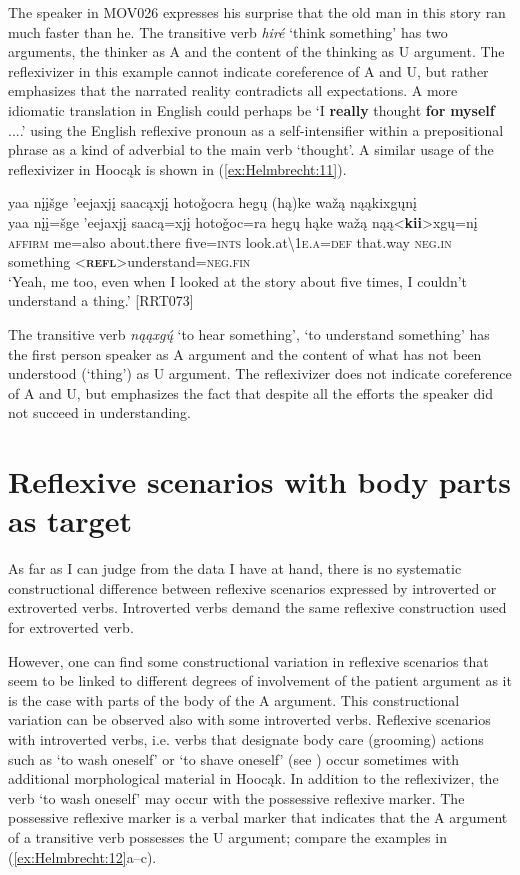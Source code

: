 \documentclass[output=paper]{langscibook}
\begin{document}
The speaker in MOV026 expresses his surprise that the old man in this story ran much faster than he. The transitive verb \textit{hiré} `think something' has two arguments, the thinker as A and the content of the thinking as U argument. The reflexivizer in this example cannot indicate coreference of A and U, but rather emphasizes that the narrated reality contradicts all expectations. A more idiomatic translation in English could perhaps be `I \textbf{really} thought \textbf{for} \textbf{myself} ....' using the English reflexive pronoun as a self-intensifier within a prepositional phrase as a kind of adverbial to the main verb `thought'. A similar usage of the reflexivizer in Hoocąk is shown in (\ref{ex:Helmbrecht:11}).

\ea  \label{ex:Helmbrecht:11} 
 \glll  yaa nįįšge 'eejaxjį saacąxjį hoto\v{g}ocra hegų (hą)ke wažą nąąkixgųnį  \\
   {yaa}  {nįį=šge}   {'eejaxjį}  {saacą=xjį}   {hoto\v{g}oc=ra}  {hegų} {hąke} {wažą}   {nąą<\textbf{kii}>xgų=nį}\\
  {\textsc{affirm}} {me=also}  {about.there} {five=\textsc{ints}} {look.at{\textbackslash}\textsc{1e.a=def}} {that.way}  {\textsc{neg.in}}  {something} {<\textbf{\textsc{\textsc{refl}}}>understand=\textsc{neg.fin}}\\
 \glt `Yeah, me too, even when I looked at the story about five times, I couldn't understand a thing.' [RRT073]
\z 

The transitive verb \textit{nąąxgų́} `to hear something', `to understand something' has the first person speaker as A argument and the content of what has not been understood (`thing') as U argument. The reflexivizer does not indicate coreference of A and U, but emphasizes the fact that despite all the efforts the speaker did not succeed in understanding.

\section{Reflexive scenarios with body parts as target}\label{sec:Helmbrecht:4}

As far as I can judge from the data I have at hand, there is no systematic constructional difference between reflexive scenarios expressed by introverted or extroverted verbs. Introverted verbs demand the same reflexive construction used for extroverted verb. 

However, one can find some constructional variation in reflexive scenarios that seem to be linked to different degrees of involvement of the patient argument as it is the case with parts of the body of the A argument. This constructional variation can be observed also with some introverted verbs. Reflexive scenarios with introverted verbs, i.e. verbs that designate body care (grooming) actions such as `to wash oneself' or `to shave oneself' (see \citealt{haspelmath2019comparing}) occur sometimes with additional morphological material in Hoocąk. In addition to the reflexivizer, the verb `to wash oneself' may occur with the possessive reflexive marker. The possessive reflexive marker is a verbal marker that indicates that the A argument of a transitive verb possesses the U argument; compare the examples in (\ref{ex:Helmbrecht:12}a--c).
\end{document}
